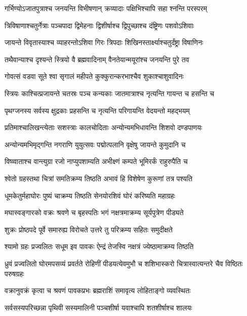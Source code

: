 \twolineshloka
{गर्भिण्योऽजातपुत्राश्च जनयन्ति विभीषणान्}
{क्रव्यादाः पक्षिभिश्चापि सहा श्नन्ति परस्परम्}


\twolineshloka
{त्रिविषाणाश्चतुर्नेत्राः पञ्चपादा द्विमेहनाः}
{द्विशीर्षाश्च द्विपुच्छाश्च दंष्ट्रिणः पशवोऽशिवाः}


\twolineshloka
{जायन्ते विवृतास्याश्च व्याहरन्तोऽशिवा गिरः}
{त्रिपदाः शिखिनस्तार्क्ष्याश्चतुर्दंष्ट्रा विषाणिनः}


\twolineshloka
{तथैवान्याश्च दृश्यन्ते स्त्रियो वै ब्रह्मवादिनाम्}
{वैनतेयान्मयूरांश्च जनयन्ति पुरे तव}


\twolineshloka
{गोवत्सं वडवा सूते श्वा सृगालं महीपते}
{कुक्कुरान्करभाश्चैव शुकाश्चाशुवादिनः}


\twolineshloka
{स्त्रियः काश्चित्प्रजायन्ते चतस्रः पञ्च कन्यकाः}
{जातमात्राश्च नृत्यन्ति गायन्त च हसन्ति च}


\twolineshloka
{पृथग्जनस्य सर्वस्य क्षुद्रकाः प्रहसन्ति च}
{नृत्यन्ति परिगायन्ति वेदयन्तो महद्भयम्}


\twolineshloka
{प्रतिमाश्चालिखन्त्येताः सशस्त्राः कालचोदिताः}
{अन्योन्यमभिधावन्ति शिशवो दण्डपाणयः}


\twolineshloka
{अन्योन्यमभिमृद्गन्ति नगराणि युयुत्सवः}
{पद्मोत्पलानि वृक्षेषु जायन्ते कुमुदानि च}


\twolineshloka
{विष्व्वाताश्च वान्त्युग्रा रजो नाप्युपशाम्यति}
{अभीक्ष्णं कम्पते भूमिरर्कं राहुरुपैति च}


\twolineshloka
{श्वेतो ग्रहस्तथा चित्रां समतिक्रम्य तिष्ठति}
{अभावं हि विशेषेण कुरूणां तत्र पश्यति}


\twolineshloka
{धूमकेतुर्महाघोरः पुष्यं चाक्रम्य तिष्ठति}
{सेनयोरशिवं घोरं करिष्यति महाग्रहः}


\twolineshloka
{मघास्वङ्गारको वक्रः श्रवणे च बृहस्पतिः}
{भगं नक्षत्रमाक्रम्य सूर्यपुत्रेण पीड्यते}


\twolineshloka
{शुक्रः प्रोष्ठपदे पूर्वे समारुह्य विरोचते}
{उत्तरे तु परिक्रम्य सहितः समुदीक्षते}


\twolineshloka
{श्यामो ग्रहः प्रज्वलितः सधूम इव पावकः}
{ऐन्द्रं तेजस्वि नक्षत्रं ज्येष्ठामाक्रम्य तिष्ठति}


\threelineshloka
{ध्रुवं प्रज्वलितो घोरमपसव्यं प्रवर्तते}
{रोहिणीं पीडयत्येवमुभौ च शशिभास्करो}
{चित्रास्वात्यन्तरे चैव विष्ठितः परुषग्रहः}


\twolineshloka
{वक्रानुवक्रं कृत्वा च श्रवणं पावकप्रभः}
{ब्रह्मराशिं समावृत्य लोहिताङ्गो व्यवस्थितः}


\twolineshloka
{सर्वसस्यपरिच्छन्ना पृथिवी सस्यमालिनी}
{पञ्चशीर्षा यवाश्चापि शतशीर्षाश्च शालयः}



